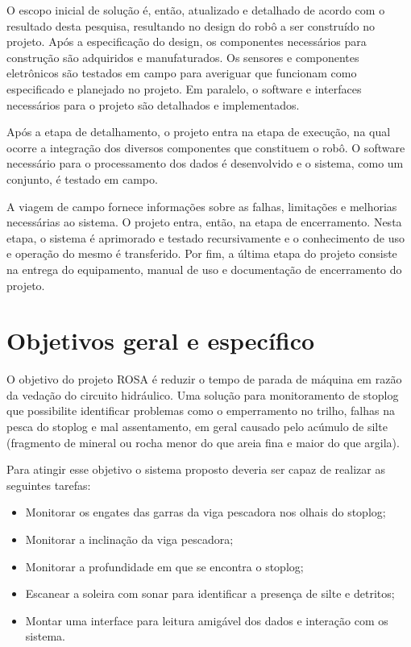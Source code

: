 O escopo inicial de solução é, então, atualizado e detalhado de acordo com o 
resultado desta pesquisa, resultando no design do robô a ser construído no projeto. 
Após a especificação do design, os componentes necessários para construção são
adquiridos e manufaturados. Os sensores e componentes eletrônicos são testados
em campo para averiguar que funcionam como especificado e planejado no
projeto. Em paralelo, o software e interfaces necessários para o projeto são 
detalhados e implementados. 

Após a etapa de detalhamento, o projeto entra na etapa de execução, na qual
ocorre a integração dos diversos componentes que constituem o robô.
O software necessário para o processamento dos dados é desenvolvido e o
sistema, como um conjunto, é testado em campo. 

A viagem de campo fornece informações sobre as falhas, limitações e melhorias 
necessárias ao sistema. O projeto entra, então, na etapa de encerramento. Nesta 
etapa, o sistema é aprimorado e testado recursivamente e o conhecimento de uso e 
operação do mesmo é transferido. Por fim, a última etapa do projeto consiste na
entrega do equipamento, manual de uso e documentação de encerramento do projeto.

\section{Objetivos geral e específico}

O objetivo do projeto ROSA é reduzir o tempo de parada de máquina em razão da
vedação do circuito hidráulico. Uma solução para monitoramento de stoplog que
possibilite identificar problemas como o emperramento no trilho, falhas na
pesca do stoplog e mal assentamento, em geral causado pelo acúmulo de silte
(fragmento de mineral ou rocha menor do que areia fina e maior do que argila).

Para atingir esse objetivo o sistema proposto deveria ser capaz de realizar as
seguintes tarefas:

\begin{itemize}
	\item Monitorar os engates das garras da viga pescadora nos olhais do stoplog;
	\item Monitorar a inclinação da viga pescadora;
	\item Monitorar a profundidade em que se encontra o stoplog;
	\item Escanear a soleira com sonar para identificar a presença de silte e 
	detritos; 
	\item Montar uma interface para leitura amigável dos dados e interação com os
	sistema.
\end{itemize}

